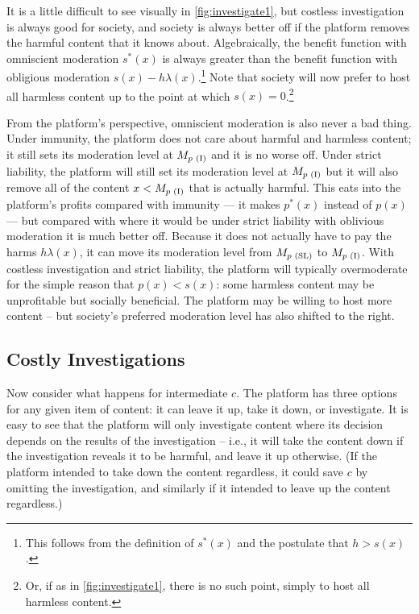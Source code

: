 It is a little difficult to see visually in \autoref{fig:investigate1}, but costless investigation is always good for society, and society is always better off if the platform removes the harmful content that it knows about. Algebraically, the  benefit function with omniscient moderation $s^*(x)$  is always greater than the benefit function with obligious moderation $s(x) - h\lambda(x)$.\footnote{This follows from the definition of $s^*(x)$ and the postulate that $h > s(x)$.} Note that society will now prefer to host all harmless content up to the point at which $s(x) = 0$.\footnote{Or, if as in \ref{fig:investigate1}, there is no such point, simply to host all harmless content.}

From the platform's perspective, omniscient moderation is also never a bad thing. Under immunity, the platform does not care about harmful and harmless content; it still sets its moderation level at $M_{p \text{ (I)}}$ and it is no worse off. Under strict liability, the platform will still set its moderation level at $M_{p \text{ (I)}}$ but it will also remove all of the content $x < M_{p \text{ (I)}}$ that is actually harmful. This eats into the platform's profits compared with immunity --- it makes $p^*(x)$ instead of  $p(x)$ --- but compared with where it would be under strict liability with oblivious moderation it is much better off. Because it does not actually have to pay the harms $h\lambda(x)$, it can move its moderation level from $M_{p \text{ (SL)}}$ to $M_{p \text{ (I)}}$. With costless investigation and strict liability, the platform will typically overmoderate for the simple reason that $p(x) < s(x)$: some harmless content may be unprofitable but socially beneficial. The platform may be willing to host more content -- but society's preferred moderation level has also shifted to the right.

\subsection{Costly Investigations}

Now consider what happens for intermediate $c$. The platform has three options for any given item of content: it can leave it up, take it down, or investigate. It is easy to see that the platform will only investigate content where its decision depends on the results of the investigation -- i.e.,  it will take the content down if the investigation reveals it to be harmful, and leave it up otherwise. (If the platform intended to take down the content regardless, it could save $c$ by omitting the investigation, and similarly if it intended to leave up the content regardless.)


